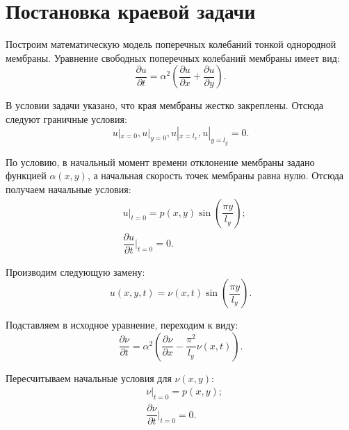 \section{Постановка краевой задачи}
{

Построим математическую модель поперечных колебаний тонкой однородной мембраны.
Уравнение свободных поперечных колебаний мембраны имеет вид:
    \begin{equation}\label{source_func}
      \dfrac{\partial u}{\partial t} = \alpha^2(
      \dfrac{\partial u}{\partial x} + 
      \dfrac{\partial u}{\partial y}).
    \end{equation}

В условии задачи указано, что края мембраны жестко закреплены. Отсюда
    следуют граничные условия:
    \begin{equation}
    u|_{x=0}, 
    u|_{y=0},  
    u|_{x=l_x}, 
    u|_{y=l_y} = 0.
    \end{equation}
    
По условию, в начальный момент времени отклонение мембраны задано функцией $\alpha(x, y)$, а начальная скорость точек мембраны равна нулю. Отсюда получаем начальные условия:
    \begin{align*}
        &  u|_{t=0} = p(x,y)\sin(\dfrac{\pi y}{l_y});\\        
        & \dfrac{\partial u}{\partial t}|_{t=0} = 0.
    \end{align*}
    
Производим следующую замену:
     \begin{equation}\label{change}
    	u(x,y,t) = \nu(x,t)\sin (\dfrac{\pi y}{l_y}).
    \end{equation}    
    
Подставляем в исходное уравнение, переходим к виду:
    \begin{equation}
         \dfrac{\partial \nu}{\partial t} = \alpha^2(\dfrac{\partial \nu}{\partial x}
        - \dfrac{\pi^2}{l_y}\nu(x, t)).
    \end{equation}
    
    Пересчитываем начальные условия для $\nu(x,y)$:
     \begin{align*}
        &  \nu|_{t=0} = p(x,y);\\        
        & \dfrac{\partial \nu}{\partial t}|_{t=0} = 0.
    \end{align*}
    
}

